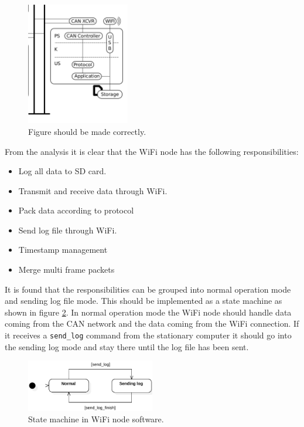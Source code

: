 \begin{figure}[!h]
\centering
\includegraphics[width=0.4\textwidth]{graphics/wifi_node}
\caption{Figure should be made correctly.}
\label{fig:wifi_node}
\end{figure}

From the analysis it is clear that the WiFi node has the following responsibilities:

\begin{itemize}
\item Log all data to SD card.
\item Transmit and receive data through WiFi.
\item Pack data according to protocol
\item Send log file through WiFi.
\item Timestamp management
\item Merge multi frame packets
\end{itemize}

It is found that the responsibilities can be grouped into normal operation mode and sending log file mode.
This should be implemented as a state machine as shown in figure \ref{fig:StateDiagram_NodeWiFiStates}.
In normal operation mode the WiFi node should handle data coming from the CAN network and the data coming from the WiFi connection.
If it receives a \texttt{send\_log} command from the stationary computer it should go into the sending log mode and stay there until the log file has been sent.

\begin{figure}[!h]
\centering
\includegraphics[width=0.5\textwidth]{graphics/StateDiagram_NodeWiFiStates}
\caption{State machine in WiFi node software.}
\label{fig:StateDiagram_NodeWiFiStates}
\end{figure}

